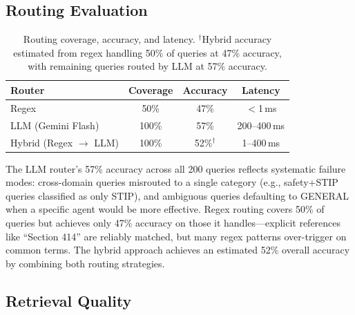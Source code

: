 \documentclass{article}
\newcommand{\numQueries}{200}
\begin{document}
\subsection{Routing Evaluation}
\label{sec:routing_eval}

\begin{table}[H]
\centering
\footnotesize
\begin{tabular}{l c c c}
\toprule
\textbf{Router} & \textbf{Coverage} & \textbf{Accuracy} & \textbf{Latency} \\
\midrule
Regex & 50\% & 47\% & $<\!$1\,ms \\
LLM (Gemini Flash) & 100\% & 57\% & 200--400\,ms \\
Hybrid (Regex $\rightarrow$ LLM) & 100\% & 52\%$^\dagger$ & 1--400\,ms \\
\bottomrule
\end{tabular}
\caption{Routing coverage, accuracy, and latency. $^\dagger$Hybrid accuracy estimated from regex handling 50\% of queries at 47\% accuracy, with remaining queries routed by LLM at 57\% accuracy.}
\label{tab:routing_eval}
\end{table}

The LLM router's 57\% accuracy across all \numQueries{} queries reflects systematic failure modes: cross-domain queries misrouted to a single category (e.g., safety+STIP queries classified as only STIP), and ambiguous queries defaulting to GENERAL when a specific agent would be more effective. Regex routing covers 50\% of queries but achieves only 47\% accuracy on those it handles---explicit references like ``Section 414'' are reliably matched, but many regex patterns over-trigger on common terms. The hybrid approach achieves an estimated 52\% overall accuracy by combining both routing strategies.

\subsection{Retrieval Quality}
\end{document}
